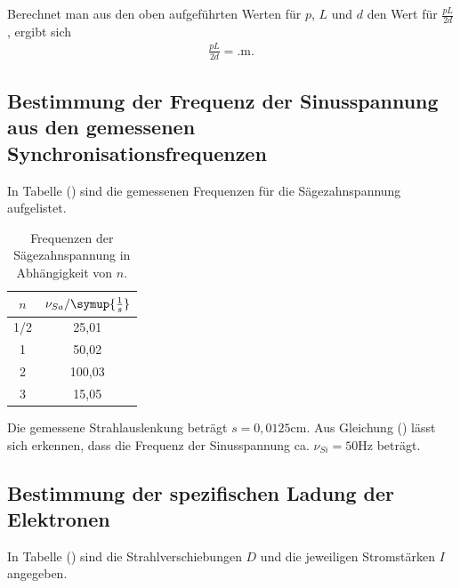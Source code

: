 Berechnet man aus den oben aufgeführten Werten für $p$, $L$ und $d$ den Wert für $\frac{pL}{2d}$, ergibt sich
\begin{align*}
\frac{pL}{2d} = . \si{\meter}.
\end{align*}

\subsection{Bestimmung der Frequenz der Sinusspannung aus den gemessenen Synchronisationsfrequenzen}

In Tabelle () sind die gemessenen Frequenzen für die Sägezahnspannung aufgelistet.

\begin{table}[H]
  \centering
  \caption{Frequenzen der Sägezahnspannung in Abhängigkeit von $n$.}
  \label{tab:Spannungsamplitude}
  \begin{tabular}{c c}
    \toprule
    $n$ & $\nu_{Sa} / \symup{\frac{1}{s}}$ \\
    \midrule
    1/2 &  25,01  \\
      1 &  50,02  \\
      2 & 100,03  \\
      3 & 15,05  \\
    \bottomrule
  \end{tabular}
\end{table}

Die gemessene Strahlauslenkung beträgt $s = 0,0125 \si{\cm} $.
Aus Gleichung () lässt sich erkennen, dass die Frequenz der Sinusspannung ca. $\nu_{Si} = 50 \si{\hertz}$ beträgt.
























\subsection{Bestimmung der spezifischen Ladung der Elektronen}
In Tabelle () sind die Strahlverschiebungen $D$ und die jeweiligen Stromstärken $I$ angegeben.


